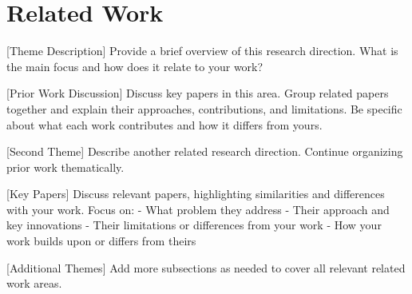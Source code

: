 
\section{Related Work}
\label{sec:related}

% 


[Theme Description] Provide a brief overview of this research direction. What is the main focus and how does it relate to your work?

[Prior Work Discussion] Discuss key papers in this area. Group related papers together and explain their approaches, contributions, and limitations. Be specific about what each work contributes and how it differs from yours.

[Second Theme] Describe another related research direction. Continue organizing prior work thematically.

[Key Papers] Discuss relevant papers, highlighting similarities and differences with your work. Focus on:
- What problem they address
- Their approach and key innovations
- Their limitations or differences from your work
- How your work builds upon or differs from theirs

[Additional Themes] Add more subsections as needed to cover all relevant related work areas.


